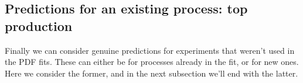 \subsection{Predictions for an existing process: top production}
Finally we can consider genuine predictions for experiments that weren't used in the PDF fits. These can either be for processes already in the fit, or for new ones. Here we consider the former, and in the next subsection we'll end with the latter.
\begin{figure}[H]
    \begin{center}
    \end{center}
  \vspace{-0.55cm}

\end{figure}

